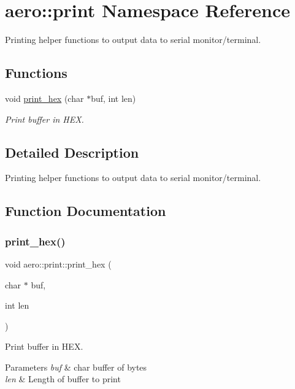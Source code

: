 \hypertarget{namespaceaero_1_1print}{}\section{aero\+:\+:print Namespace Reference}
\label{namespaceaero_1_1print}


Printing helper functions to output data to serial monitor/terminal.  


\subsection*{Functions}
\begin{DoxyCompactItemize}
\item 
void \hyperlink{namespaceaero_1_1print_ae5cd2cd6bb27272e17696934ee2b2b04}{print\+\_\+hex} (char $\ast$buf, int len)
\begin{DoxyCompactList}\small\item\em Print buffer in H\+EX. \end{DoxyCompactList}\end{DoxyCompactItemize}


\subsection{Detailed Description}
Printing helper functions to output data to serial monitor/terminal. 

\subsection{Function Documentation}
\mbox{\label{namespaceaero_1_1print_ae5cd2cd6bb27272e17696934ee2b2b04}} 
\subsubsection{\texorpdfstring{print\+\_\+hex()}{print\_hex()}}
{\footnotesize\ttfamily void aero\+::print\+::print\+\_\+hex (\begin{DoxyParamCaption}\item[{char $\ast$}]{buf,  }\item[{int}]{len }\end{DoxyParamCaption})}



Print buffer in H\+EX. 


\begin{DoxyParams}{Parameters}
{\em buf} & char buffer of bytes \\
\hline
{\em len} & Length of buffer to print \\
\hline
\end{DoxyParams}
